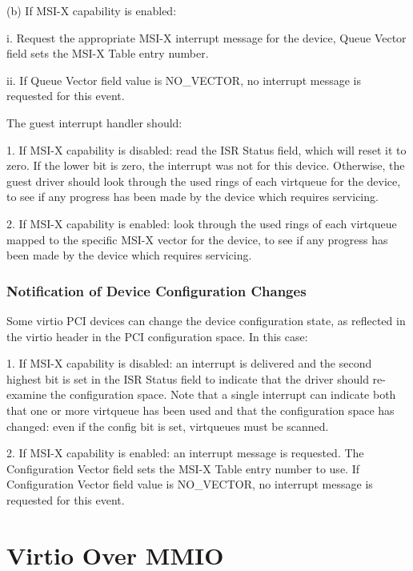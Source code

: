   (b) If MSI-X capability is enabled:

    i. Request the appropriate MSI-X interrupt message for the
      device, Queue Vector field sets the MSI-X Table entry
      number.

    ii. If Queue Vector field value is NO_VECTOR, no interrupt
      message is requested for this event.

The guest interrupt handler should:

1. If MSI-X capability is disabled: read the ISR Status field,
  which will reset it to zero. If the lower bit is zero, the
  interrupt was not for this device. Otherwise, the guest driver
  should look through the used rings of each virtqueue for the
  device, to see if any progress has been made by the device
  which requires servicing.

2. If MSI-X capability is enabled: look through the used rings of
  each virtqueue mapped to the specific MSI-X vector for the
  device, to see if any progress has been made by the device
  which requires servicing.

\subsubsection{Notification of Device Configuration Changes}\label{sec:Virtio Transport Options / Virtio Over PCI Bus / PCI-specific Initialization And Device Operation / Notification of Device Configuration Changes}

Some virtio PCI devices can change the device configuration
state, as reflected in the virtio header in the PCI configuration
space. In this case:

1. If MSI-X capability is disabled: an interrupt is delivered and
  the second highest bit is set in the ISR Status field to
  indicate that the driver should re-examine the configuration
  space.  Note that a single interrupt can indicate both that one
  or more virtqueue has been used and that the configuration
  space has changed: even if the config bit is set, virtqueues
  must be scanned.

2. If MSI-X capability is enabled: an interrupt message is
  requested. The Configuration Vector field sets the MSI-X Table
  entry number to use. If Configuration Vector field value is
  NO_VECTOR, no interrupt message is requested for this event.

\section{Virtio Over MMIO}\label{sec:Virtio Transport Options / Virtio Over MMIO}

